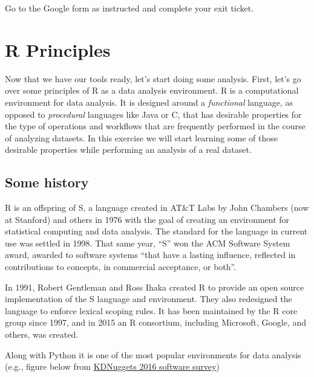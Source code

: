 \documentclass[12pt,]{book}
\theoremstyle{definition}
\theoremstyle{definition}
\theoremstyle{remark}
\begin{document}
Go to the Google form as instructed and complete your exit ticket.

\chapter{R Principles}\label{r-principles}

Now that we have our tools ready, let's start doing some analysis.
First, let's go over some principles of R as a data analysis
environment. R is a computational environment for data analysis. It is
designed around a \emph{functional} language, as opposed to
\emph{procedural} languages like Java or C, that has desirable
properties for the type of operations and workflows that are frequently
performed in the course of analyzing datasets. In this exercise we will
start learning some of those desirable properties while performing an
analysis of a real dataset.

\section{Some history}\label{some-history}

R is an offspring of S, a language created in AT\&T Labs by John
Chambers (now at Stanford) and others in 1976 with the goal of creating
an environment for statistical computing and data analysis. The standard
for the language in current use was settled in 1998. That same year,
``S'' won the ACM Software System award, awarded to software systems
``that have a lasting influence, reflected in contributions to concepts,
in commercial acceptance, or both''.

In 1991, Robert Gentleman and Ross Ihaka created R to provide an open
source implementation of the S language and environment. They also
redesigned the language to enforce lexical scoping rules. It has been
maintained by the R core group since 1997, and in 2015 an R consortium,
including Microsoft, Google, and others, was created.

Along with Python it is one of the most popular environments for data
analysis (e.g., figure below from
\href{http://www.kdnuggets.com/2016/06/r-python-top-analytics-data-mining-data-science-software.html}{KDNuggets
2016 software survey})
\end{document}
